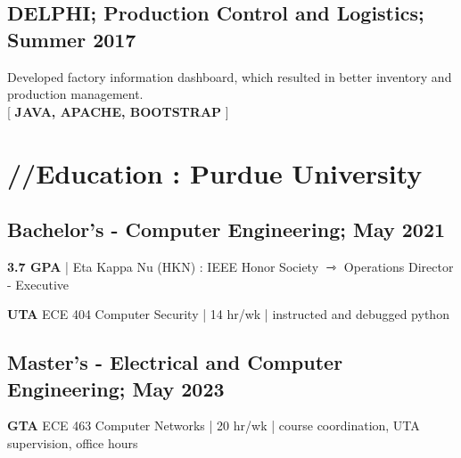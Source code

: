 \documentclass[10pt, letterpaper]{article}
\newcommand{\emphasis}[1]{
    \textcolor{purduegold}{\textbf{#1}}
}
\newcommand{\Emphasis}[1]{\uppercase{\textbf{#1}}}
\newcommand{\EMPHASIS}[1]{
    \uppercase{\emphasis{#1}}
}
\begin{document}
    \subsection*{\Emphasis{Delphi}; \emphasis{Production Control and Logistics;} Summer 2017}
        \begin{enumerate}[label={[\arabic*]}]
            \setcounter{enumi}{-1}
            \item Developed factory information dashboard, which resulted in better inventory and production management.\\ {[{\scriptsize \EMPHASIS{Java, Apache, Bootstrap}}]}
        \end{enumerate}
\section*{\huge{//Education :\emphasis{Purdue University}}}
    \subsection*{Bachelor's - Computer Engineering; May 2021}
        \begin{enumerate}[label={[\arabic*]}]
            \setcounter{enumi}{-1}
            \item \emphasis{3.7 GPA} | Eta Kappa Nu (HKN) : IEEE Honor Society $\rightarrowtriangle$ Operations Director - Executive
            \item \emphasis{UTA} ECE 404 Computer Security | 14 hr/wk | instructed and debugged python
        \end{enumerate}
    \subsection*{Master's - Electrical and Computer Engineering; May 2023}
        \begin{enumerate}[label={[\arabic*]}]
            \setcounter{enumi}{-1}
            \item \emphasis{GTA} ECE 463 Computer Networks | 20 hr/wk | course coordination, UTA supervision, office hours
        \end{enumerate}
\end{document}
